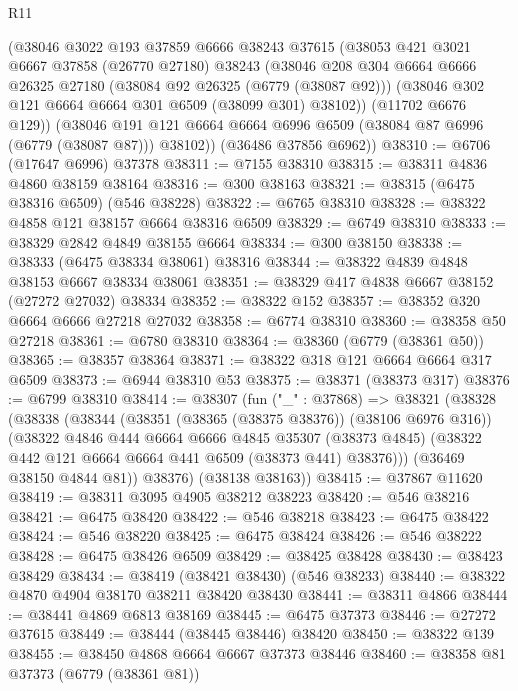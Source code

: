 \begin{lexlean}{R11}
\begin{coremodule}
      (@38046
        @3022
        @193
        @37859
        @6666
        @38243
        @37615
        (@38053
          @421
          @3021
          @6667
          @37858
          (@26770 @27180)
          @38243
          (@38046
            @208
            @304
            @6664
            @6666
            @26325
            @27180
            (@38084 @92 @26325 (@6779 (@38087 @92)))
            (@38046 @302 @121 @6664 @6664 @301 @6509 (@38099 @301) @38102))
          (@11702 @6676 @129))
        (@38046 @191 @121 @6664 @6664 @6996 @6509 (@38084 @87 @6996 (@6779 (@38087 @87))) @38102))
      (@36486 @37856 @6962))
@38310 := @6706 (@17647 @6996) @37378
@38311 := @7155 @38310
@38315 := @38311 @4836 @4860 @38159 @38164
@38316 := @300 @38163
@38321 := @38315 (@6475 @38316 @6509) (@546 @38228)
@38322 := @6765 @38310
@38328 := @38322 @4858 @121 @38157 @6664 @38316 @6509
@38329 := @6749 @38310
@38333 := @38329 @2842 @4849 @38155 @6664
@38334 := @300 @38150
@38338 := @38333 (@6475 @38334 @38061) @38316
@38344 := @38322 @4839 @4848 @38153 @6667 @38334 @38061
@38351 := @38329 @417 @4838 @6667 @38152 (@27272 @27032) @38334
@38352 := @38322 @152
@38357 := @38352 @320 @6664 @6666 @27218 @27032
@38358 := @6774 @38310
@38360 := @38358 @50 @27218
@38361 := @6780 @38310
@38364 := @38360 (@6779 (@38361 @50))
@38365 := @38357 @38364
@38371 := @38322 @318 @121 @6664 @6664 @317 @6509
@38373 := @6944 @38310 @53
@38375 := @38371 (@38373 @317)
@38376 := @6799 @38310
@38414 := @38307
    (fun ("_" : @37868) =>
    @38321
      (@38328
        (@38338
          (@38344
            (@38351 (@38365 (@38375 @38376)) (@38106 @6976 @316))
            (@38322
              @4846
              @444
              @6664
              @6666
              @4845
              @35307
              (@38373 @4845)
              (@38322 @442 @121 @6664 @6664 @441 @6509 (@38373 @441) @38376)))
          (@36469 @38150 @4844 @81))
        @38376)
      (@38138 @38163))
@38415 := @37867 @11620
@38419 := @38311 @3095 @4905 @38212 @38223
@38420 := @546 @38216
@38421 := @6475 @38420
@38422 := @546 @38218
@38423 := @6475 @38422
@38424 := @546 @38220
@38425 := @6475 @38424
@38426 := @546 @38222
@38428 := @6475 @38426 @6509
@38429 := @38425 @38428
@38430 := @38423 @38429
@38434 := @38419 (@38421 @38430) (@546 @38233)
@38440 := @38322 @4870 @4904 @38170 @38211 @38420 @38430
@38441 := @38311 @4866
@38444 := @38441 @4869 @6813 @38169
@38445 := @6475 @37373
@38446 := @27272 @37615
@38449 := @38444 (@38445 @38446) @38420
@38450 := @38322 @139
@38455 := @38450 @4868 @6664 @6667 @37373 @38446
@38460 := @38358 @81 @37373 (@6779 (@38361 @81))

\end{coremodule}
\end{lexlean}
